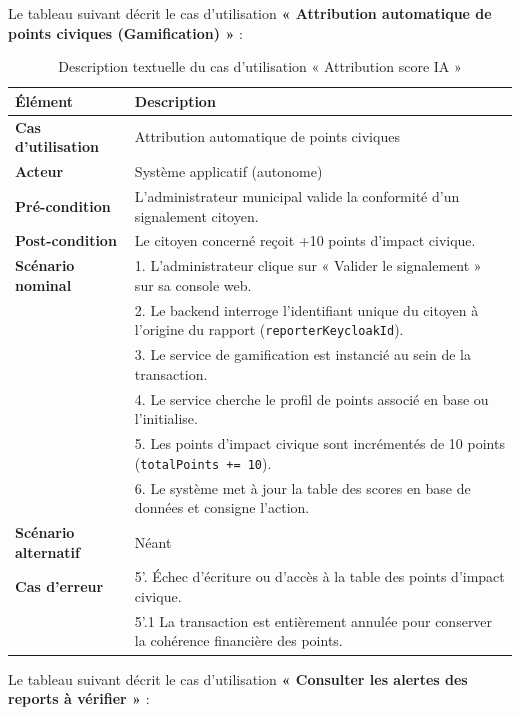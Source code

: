 Le tableau suivant décrit le cas d'utilisation \textbf{« Attribution automatique de points civiques (Gamification) »} :

\begin{table}[H]
    \centering
    \caption{Description textuelle du cas d'utilisation « Attribution score IA »}
    \label{tab:txt_award_points}
    \vspace{0.2cm}
    \small
    \begin{tabularx}{\textwidth}{|l|X|}
        \hline
        \textbf{Élément} & \textbf{Description} \\ \hline
        \textbf{Cas d’utilisation} & Attribution automatique de points civiques \\ \hline
        \textbf{Acteur} & Système applicatif (autonome) \\ \hline
        \textbf{Pré-condition} & L'administrateur municipal valide la conformité d'un signalement citoyen. \\ \hline
        \textbf{Post-condition} & Le citoyen concerné reçoit +10 points d'impact civique. \\ \hline
        \textbf{Scénario nominal} &
        1. L'administrateur clique sur « Valider le signalement » sur sa console web.\\
        & 2. Le backend interroge l'identifiant unique du citoyen à l'origine du rapport (\texttt{reporterKeycloakId}).\\
        & 3. Le service de gamification est instancié au sein de la transaction.\\
        & 4. Le service cherche le profil de points associé en base ou l'initialise.\\
        & 5. Les points d'impact civique sont incrémentés de 10 points (\texttt{totalPoints += 10}).\\
        & 6. Le système met à jour la table des scores en base de données et consigne l'action. \\ \hline
        \textbf{Scénario alternatif} & Néant \\ \hline
        \textbf{Cas d’erreur} &
        5'. Échec d'écriture ou d'accès à la table des points d'impact civique.\\
        & 5'.1 La transaction est entièrement annulée pour conserver la cohérence financière des points. \\ \hline
    \end{tabularx}
\end{table}

Le tableau suivant décrit le cas d'utilisation \textbf{« Consulter les alertes des reports à vérifier »} :

